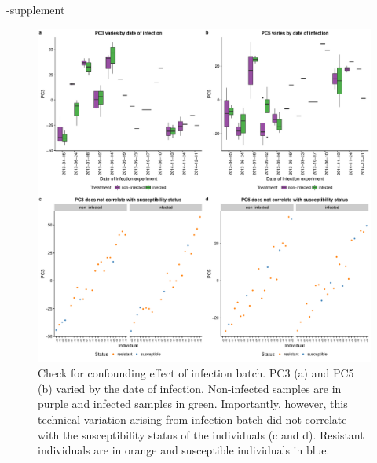 \documentclass[fleqn,10pt]{wlscirep}
\begin{document}
\begin{filecontents}{\jobname-supplement}
\begin{figure}[ht]
\centering
\includegraphics[width=\linewidth]{../figure/batch-infection.pdf}
\caption{
Check for confounding effect of infection batch. PC3 (a) and PC5 (b)
varied by the date of infection. Non-infected samples are in purple
and infected samples in green. Importantly, however, this technical
variation arising from infection batch did not correlate with the
susceptibility status of the individuals (c and d). Resistant
individuals are in orange and susceptible individuals in blue.
}
\label{fig:infection}
\end{figure}


\end{filecontents}
\end{document}
